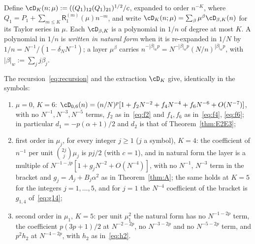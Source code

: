 Define $\cD_K(n;\mu):=((Q_1)_{12}(Q_1)_{21})^{1/2}/c$, expanded to order $n^{-K}$, where
$Q_1=P_1+\sum_{m\le K}\mathsf R_1^{(m)}(\mu)n^{-m}$, and write $\cD_K(n;\mu)=\sum_\beta\mu^\beta\cD_{\beta,K}(n)$ for its
Taylor series in $\mu$. Each $\cD_{\beta,K}$ is a polynomial in $1/n$ of degree at most $K$. A polynomial in $1/n$ is
\emph{written in natural form} when it is re-expanded in $1/N$ by $1/n=N^{-1}/(1-\delta_NN^{-1})$; a layer $\mu^\beta$ carries
$n^{-|\beta|_wp}=N^{-|\beta|_wp}(N/n)^{|\beta|_wp}$, with $|\beta|_w:=\sum_jj\beta_j$.

\begin{lemma}\label{lem:N6d}
The recursion~\eqref{eq:recursion} and the extraction $\cD_K$ give, identically in the symbols:
\begin{enumerate}
\item[(a)] $\mu=0$, $K=6$: $\cD_{0,6}(n)=(n/N)^p[1+f_2N^{-2}+f_4N^{-4}+f_6N^{-6}+O(N^{-7})]$, with no $N^{-1},N^{-3},N^{-5}$
terms, $f_2$ as in~\eqref{eq:f2} and $f_4,f_6$ as in~\eqref{eq:f4}, \eqref{eq:f6}; in particular $d_1=-p(\alpha+1)/2$ and $d_2$ is
that of Theorem~\ref{thm:E2E3};
\item[(b)] first order in $\mu_j$, for every integer $j\ge1$ ($j$ a symbol), $K=4$: the coefficient of $n^{-1}$ per unit
$\binom{2j}j\mu_j$ is $pj/2$ (with $c=1$), and in natural form the layer is a multiple of
$N^{-1-jp}[1+g_jN^{-2}+O(N^{-4})]$, with no $N^{-1}$, $N^{-3}$ term in the bracket and $g_j=A_j+B_j\alpha^2$ as in
Theorem~\ref{thm:A}; the same holds at $K=5$ for the integers $j=1,\dots,5$, and for $j=1$ the $N^{-4}$ coefficient of
the bracket is $g_{1,4}$ of~\eqref{eq:g14};
\item[(c)] second order in $\mu_1$, $K=5$: per unit $\mu_1^2$ the natural form has no $N^{-1-2p}$ term, the coefficient
$p(3p+1)/2$ at $N^{-2-2p}$, no $N^{-3-2p}$ and no $N^{-5-2p}$ term, and $p^2h_2$ at $N^{-4-2p}$, with $h_2$ as in~\eqref{eq:h2}.
\end{enumerate}
\end{lemma}

